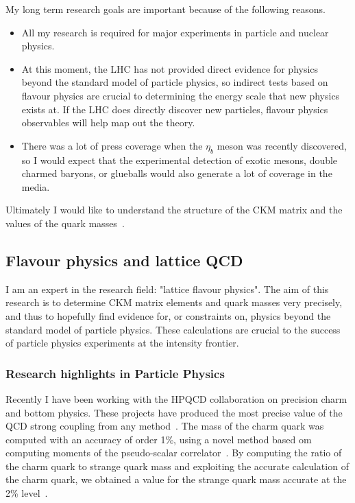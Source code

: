 My long term research goals are important because
of the following reasons.
\begin{itemize}

\item All my research is required for major
      experiments in particle and nuclear physics.

\item At this moment, the LHC has not provided direct
      evidence for physics beyond the standard model
      of particle physics, so indirect tests based
      on flavour physics are crucial to determining the
      energy scale that new physics exists at. If the LHC
      does directly discover new particles, flavour
      physics observables will help map out the theory.

\item There was a lot of press coverage when the $\eta_b$ meson
      was recently discovered, so I would expect that the experimental 
      detection of exotic mesons, double charmed baryons, or
      glueballs would also generate a lot of coverage in the
      media.

\end{itemize}

Ultimately I would like to understand the structure of the 
CKM matrix and the values of the 
quark masses~\cite{McNeile:2010xe}.



\subsection{Flavour physics and lattice QCD}

I am an expert in the research field: "lattice flavour physics".  The
aim of this research is to determine CKM matrix elements and quark
masses very precisely, and thus to hopefully find evidence for, or
constraints on, physics beyond the standard model of particle physics.
These calculations are crucial to the success of particle physics 
experiments at the intensity frontier.

\subsubsection{Research highlights in Particle Physics}



Recently I have been working with the HPQCD collaboration on
precision charm and bottom physics. 
These projects have produced the most precise
value of the QCD strong coupling from 
any method~\cite{Davies:2008sw,McNeile:2010ji}. 
The mass of the
charm quark was computed with an accuracy of order 1\%, using
a novel method based om computing moments of the pseudo-scalar
correlator~\cite{McNeile:2010ji}. 
By computing the ratio of the charm quark to strange quark 
mass and exploiting the
accurate calculation of the charm quark, we obtained a value
for the strange quark mass accurate at 
the 2\% level~\cite{Davies:2009ih}.


